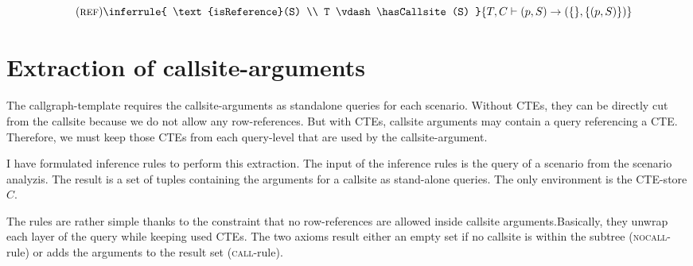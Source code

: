 \\
\fi
$$\quad(\textsc{ref})\inferrule{
   \text{isReference}(S) \\
   T \vdash \hasCallsite(S)
}{
    T, C \vdash (p, S) \rightarrow (\{\}, \{(p, S)\})
}$$

\section{Extraction of callsite-arguments}

The callgraph-template requires the callsite-arguments as standalone queries for each scenario. Without CTEs, they can be directly cut from the callsite because we do not allow any row-references. But with CTEs, callsite arguments may contain a query referencing a CTE. Therefore, we must keep those CTEs from each query-level that are used by the callsite-argument.

I have formulated inference rules to perform this extraction. The input of the inference rules is the query of a scenario from the scenario analyzis. The result is a set of tuples containing the arguments for a callsite as stand-alone queries. The only environment is the CTE-store $C$.

The rules are rather simple thanks to the constraint that no row-references are allowed inside callsite arguments.Basically, they unwrap each layer of the query while keeping used CTEs. The two axioms result either an empty set if no callsite is within the subtree (\textsc{nocall}-rule) or adds the arguments to the result set (\textsc{call}-rule).

